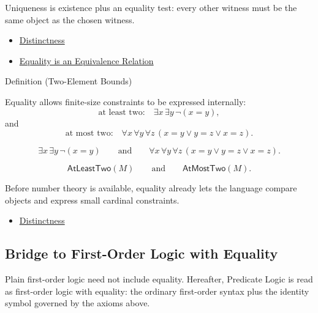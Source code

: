 \begin{remark*}[Interpretation]
Uniqueness is existence plus an equality test: every other witness must be the
same object as the chosen witness.
\end{remark*}

\begin{dependencies}
\begin{itemize}
  \item \hyperref[def:distinctness]{Distinctness}
  \item \hyperref[thm:axiomatic-equality-equivalence-relation]{Equality is an Equivalence Relation}
\end{itemize}
\end{dependencies}

\begin{definitionbox}{Definition (Two-Element Bounds)}
\begin{definition}\label{def:two-element-bounds}
Equality allows finite-size constraints to be expressed internally:
\[
  \text{at least two:}\quad
  \exists x\,\exists y\,\neg(x=y),
\]
and
\[
  \text{at most two:}\quad
  \forall x\,\forall y\,\forall z\,
  (x=y\lor y=z\lor x=z).
\]
\end{definition}
\end{definitionbox}

\begin{remark*}
\[
  \exists x\,\exists y\,\neg(x=y)
  \qquad\text{and}\qquad
  \forall x\,\forall y\,\forall z\,
  (x=y\lor y=z\lor x=z).
\]
\end{remark*}

\begin{remark*}
\[
  \mathsf{AtLeastTwo}(M)
  \qquad\text{and}\qquad
  \mathsf{AtMostTwo}(M).
\]
\end{remark*}

\begin{remark*}[Interpretation]
Before number theory is available, equality already lets the language compare
objects and express small cardinal constraints.
\end{remark*}


\begin{dependencies}
\begin{itemize}
  \item \hyperref[def:distinctness]{Distinctness}
\end{itemize}
\end{dependencies}

\subsection{Bridge to First-Order Logic with Equality}

\begin{remark*}[Exposition]
Plain first-order logic need not include equality. Hereafter, Predicate Logic
is read as first-order logic with equality: the ordinary first-order syntax
plus the identity symbol governed by the axioms above.
\end{remark*}
